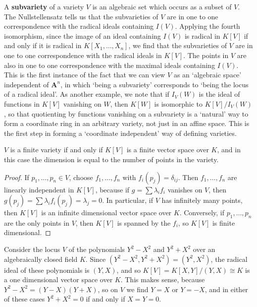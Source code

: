 A {\bf subvariety} of a variety $V$ is an algebraic set which occurs as a subset of $V$. The Nullstellensatz tells us that the subvarieties of $V$ are in one to one correspondence with the radical ideals containing $I(V)$. Applying the fourth isomorphism, since the image of an ideal containing $I(V)$ is radical in $K[V]$ if and only if it is radical in $K[X_1,\dots,X_n]$, we find that the subvarieties of $V$ are in one to one correspondence with the radical ideals in $K[V]$. The points in $V$ are also in one to one correspondence with the maximal ideals containing $I(V)$. This is the first instance of the fact that we can view $V$ as an `algebraic space' independent of $\mathbf{A}^n$, in which `being a subvariety' corresponds to `being the locus of a radical ideal'. As another example, we note that if $I_V(W)$ is the ideal of functions in $K[V]$ vanishing on $W$, then $K[W]$ is isomorphic to $K[V]/I_V(W)$, so that quotienting by functions vanishing on a subvariety is a `natural' way to form a coordinate ring in an arbitrary variety, not just in an affine space. This is the first step in forming a `coordinate independent' way of defining varieties.

\begin{prop}
    $V$ is a finite variety if and only if $K[V]$ is a finite vector space over $K$, and in this case the dimension is equal to the number of points in the variety.
\end{prop}
\begin{proof}
    If $p_1, \dots, p_n \in V$, choose $f_1, \dots, f_n$ with $f_i(p_j) = \delta_{ij}$. Then $f_1, \dots, f_n$ are linearly independent in $K[V]$, because if $g = \sum \lambda_i f_i$ vanishes on $V$, then $g(p_j) = \sum \lambda_i f_i(p_j) = \lambda_j = 0$. In particular, if $V$ has infinitely many points, then $K[V]$ is an infinite dimensional vector space over $K$. Conversely, if $p_1, \dots, p_n$ are the only points in $V$, then $K[V]$ is spanned by the $f_i$, so $K[V]$ is finite dimensional.
\end{proof}

\begin{example}
    Consider the locus $V$ of the polynomials $Y^2 - X^2$ and $Y^2 + X^2$ over an algebraically closed field $K$. Since $(Y^2 - X^2, Y^2 + X^2) = (Y^2,X^2)$, the radical ideal of these polynomials is $(Y,X)$, and so $K[V] = K[X,Y]/(Y,X) \cong K$ is a one dimensional vector space over $K$. This makes sense, because $Y^2 - X^2 = (Y-X)(Y+X)$, so on $V$ we find $Y = X$ or $Y = -X$, and in either of these cases $Y^2 + X^2 = 0$ if and only if $X = Y = 0$.
\end{example}

